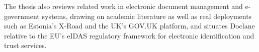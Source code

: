 \documentclass[12pt]{report}
\begin{document}
The thesis also reviews related work in electronic document management and e-government systems, drawing on academic literature as well as real deployments such as Estonia's X-Road and the UK's GOV.UK platform, and situates Doclane relative to the EU's eIDAS regulatory framework for electronic identification and trust services.

\tableofcontents


\newpage
{}










\end{document}
